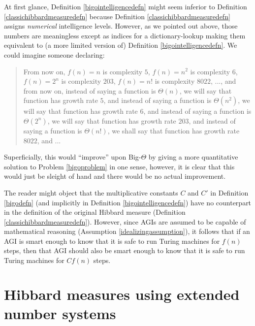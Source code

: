 \documentclass{article}
\begin{document}
At first glance, Definition \ref{bigointelligencedefn} might seem inferior to
Definition \ref{classichibbardmeasuredefn} because
Definition \ref{classichibbardmeasuredefn} assigns \emph{numerical} intelligence levels.
However, as we pointed out above, those numbers are meaningless except as indices for
a dictionary-lookup making them equivalent to (a more limited version of)
Definition \ref{bigointelligencedefn}. We could imagine someone declaring:
\begin{quote}
    From now on, $f(n)=n$ is complexity $5$, $f(n)=n^2$ is complexity $6$,
    $f(n)=2^n$ is complexity $203$,
    $f(n)=n!$ is complexity $8022$, ..., and from now on, instead of saying a
    function is $\Theta(n)$, we will say that function has growth rate $5$,
    and instead of saying a function is $\Theta(n^2)$, we will say that function
    has growth rate $6$, and instead of saying a function is $\Theta(2^n)$, we will
    say that function has growth rate $203$, and instead of saying a function is
    $\Theta(n!)$, we shall say that function has growth rate $8022$, and ...
\end{quote}
Superficially, this would ``improve'' upon Big-$\Theta$ by giving a more quantitative
solution to Problem \ref{bigoproblem} in one sense, however, it is clear
that this would just be sleight of hand and there would be no actual improvement.

The reader might object that the multiplicative constants $C$ and $C'$ in
Definition \ref{bigodefn} (and implicitly in Definition \ref{bigointelligencedefn})
have no counterpart in the definition of the original Hibbard measure
(Definition \ref{classichibbardmeasuredefn}). However, since AGIs are assumed to
be capable of mathematical reasoning (Assumption \ref{idealizingassumption}), it
follows that if an AGI is smart enough to know that it is safe to run Turing
machines for $f(n)$ steps, then that AGI should also be smart enough to know that
it is safe to run Turing machines for $Cf(n)$ steps.

\section{Hibbard measures using extended number systems}
\label{exoticsection}
\end{document}
